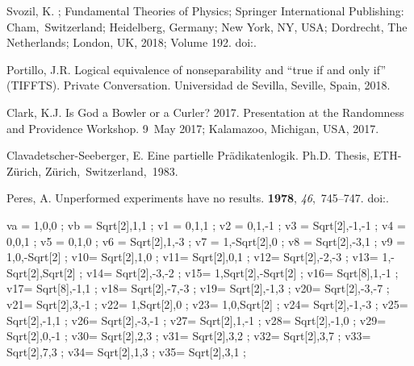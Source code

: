 \begin{thebibliography}{999}
Svozil, K.
; Fundamental Theories of
 Physics; Springer International Publishing: Cham,~Switzerland; Heidelberg, Germany; New York, NY, USA;
 Dordrecht, The Netherlands; London, UK, 2018; Volume 192.
\newblock
 doi:{\href{https://doi.org/10.1007/978-3-319-70815-7}{}}. %

Portillo, J.R.
\newblock Logical equivalence of nonseparability and ``true if and only if'' (TIFFTS). Private Conversation. %
Universidad de Sevilla, Seville, Spain, 2018.

Clark, K.J.
\newblock Is {G}od a Bowler or a Curler? 2017.
\newblock Presentation at the Randomness and Providence Workshop. 9~May 2017;
Kalamazoo, Michigan, USA, 2017.

Clavadetscher-Seeberger, E.
\newblock Eine partielle Pr{\"{a}}dikatenlogik.
\newblock Ph.D. Thesis, ETH-Z{\"{u}}rich, Z{\"{u}}rich,~Switzerland,~1983.

Peres, A.
\newblock Unperformed experiments have no results.
 {\bf 1978}, {\em 46},~745--747.
\newblock
 doi:{\href{https://doi.org/10.1119/1.11393}{}}.

\end{thebibliography}





va = {1,0,0} ;
vb = {Sqrt[2],1,1} ;
v1 = {0,1,1} ;
v2 = {0,1,-1} ;
v3 = {Sqrt[2],-1,-1} ;
v4 = {0,0,1} ;
v5 = {0,1,0} ;
v6 = {Sqrt[2],1,-3} ;
v7 = {1,-Sqrt[2],0} ;
v8 = {Sqrt[2],-3,1} ;
v9 = {1,0,-Sqrt[2]} ;
v10= {Sqrt[2],1,0} ;
v11= {Sqrt[2],0,1} ;
v12= {Sqrt[2],-2,-3} ;
v13= {1,-Sqrt[2],Sqrt[2]} ;
v14= {Sqrt[2],-3,-2} ;
v15= {1,Sqrt[2],-Sqrt[2]} ;
v16= {Sqrt[8],1,-1} ;
v17= {Sqrt[8],-1,1} ;
v18= {Sqrt[2],-7,-3} ;
v19= {Sqrt[2],-1,3} ;
v20= {Sqrt[2],-3,-7} ;
v21= {Sqrt[2],3,-1} ;
v22= {1,Sqrt[2],0} ;
v23= {1,0,Sqrt[2]} ;
v24= {Sqrt[2],-1,-3} ;
v25= {Sqrt[2],-1,1} ;
v26= {Sqrt[2],-3,-1} ;
v27= {Sqrt[2],1,-1} ;
v28= {Sqrt[2],-1,0} ;
v29= {Sqrt[2],0,-1} ;
v30= {Sqrt[2],2,3} ;
v31= {Sqrt[2],3,2} ;
v32= {Sqrt[2],3,7} ;
v33= {Sqrt[2],7,3} ;
v34= {Sqrt[2],1,3} ;
v35= {Sqrt[2],3,1} ;

